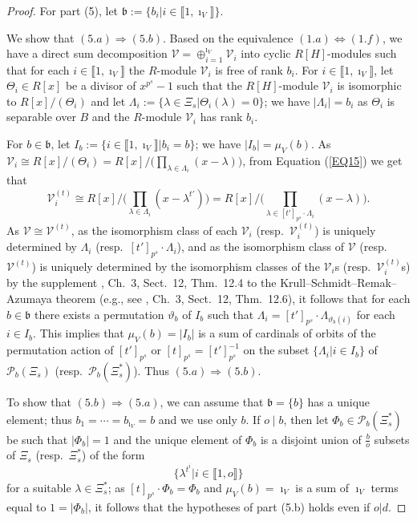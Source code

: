 \documentclass[11pt]{amsart}
\begin{document}
\begin{proof}
For part (5), let $\mathfrak b:=\{b_i|i\in\llbracket1,\imath_V\rrbracket\}$. 

We show that $(5.a)\Rightarrow (5.b)$. Based on the equivalence $(1.a)\Leftrightarrow (1.f)$, we have a direct sum decomposition $\mathcal V=\oplus_{i=1}^{\imath_V} \mathcal V_i$ into cyclic $R[H]$-modules such that for each $i\in\llbracket1,\imath_V\rrbracket$ the $R$-module $\mathcal V_i$ is free of rank $b_i$. For $i\in\llbracket1,\imath_V\rrbracket$, let $\Theta_i\in R[x]$ be a divisor of $x^{p^s}-1$ such that the $R[H]$-module $\mathcal V_i$ is isomorphic to $R[x]/(\Theta_i)$ and let $\Lambda_i:=\{\lambda\in\Xi_s|\Theta_i(\lambda)=0\}$; we have $|\Lambda_i|=b_i$ as $\Theta_i$ is separable over $B$ and the $R$-module $\mathcal V_i$ has rank $b_i$. 

For $b\in\mathfrak b$, let $I_b:=\{i\in\llbracket1,\imath_V\rrbracket|b_i=b\}$; we have $|I_b|=\mu_V(b)$. As $\mathcal V_i\cong R[x]/(\Theta_i)=R[x]/\bigl(\prod_{\lambda\in\Lambda_i} (x-\lambda)\bigr)$, from Equation (\ref{EQ15}) we get that 
\begin{equation}\label{EQ31}
\mathcal V_i^{(t)}\cong R[x]/\bigl(\prod_{\lambda\in\Lambda_i} (x-\lambda^{t'})\bigr)=R[x]/\bigl(\prod_{\lambda\in [t']_{p^s}\cdot\Lambda_i} (x-\lambda)\bigr).
\end{equation}
As $\mathcal V\cong\mathcal V^{(t)}$, as the isomorphism class of each $\mathcal V_i$ (resp.\ $\mathcal V_i^{(t)}$) is uniquely determined by $\Lambda_i$ (resp.\ $[t']_{p^s}\cdot \Lambda_i$), and as the isomorphism class of $\mathcal V$ (resp.\ $\mathcal V^{(t)}$) is uniquely determined by the isomorphism classes of the $\mathcal V_i$s (resp.\ $\mathcal V^{(t)}_i$s) by the supplement \cite{AF}, Ch.\ 3, Sect.\ 12, Thm.\ 12.4 to the Krull--Schmidt--Remak--Azumaya theorem (e.g., see \cite{AF}, Ch.\ 3, Sect.\ 12, Thm.\ 12.6), it follows that for each $b\in\mathfrak b$ there exists a permutation $\vartheta_b$ of $I_b$ such that $\Lambda_i=[t']_{p^s}\cdot \Lambda_{\vartheta_b(i)}$ for each $i\in I_b$. This implies that $\mu_V(b)=|I_b|$ is a sum of cardinals of orbits of the permutation action of $[t']_{p^s}$ or $[t]_{p^s}=[t']^{-1}_{p^s}$ on the subset $\{\Lambda_i|i\in I_b\}$ of $\mathcal P_b(\Xi_s)$ (resp.\ $\mathcal P_b(\Xi_s^{\ast})$). Thus $(5.a)\Rightarrow (5.b)$.

To show that $(5.b)\Rightarrow (5.a)$, we can assume that $\mathfrak b=\{b\}$ has a unique element; thus $b_1=\cdots=b_{\imath_V}=b$ and we use only $b$. If $o\mid b$, then let $\Phi_b\in\mathcal P_b(\Xi_s^{\ast})$ be such that $|\Phi_b|=1$ and the unique element of $\Phi_b$ is a disjoint union of $\frac{b}{o}$ subsets of $\Xi_s$ (resp.\ $\Xi_s^{\ast}$) of the form 
$$\{\lambda^{t^i}|i\in\llbracket1,o\rrbracket\}$$
for a suitable $\lambda\in \Xi_s^{\ast}$; as $[t]_{p^s}\cdot\Phi_b=\Phi_b$ and $\mu_V(b)=\imath_V$ is a sum of $\imath_V$ terms equal to $1=|\Phi_b|$, it follows that the hypotheses of part (5.b) holds even if $o|d$.


\end{proof}
\end{document}
